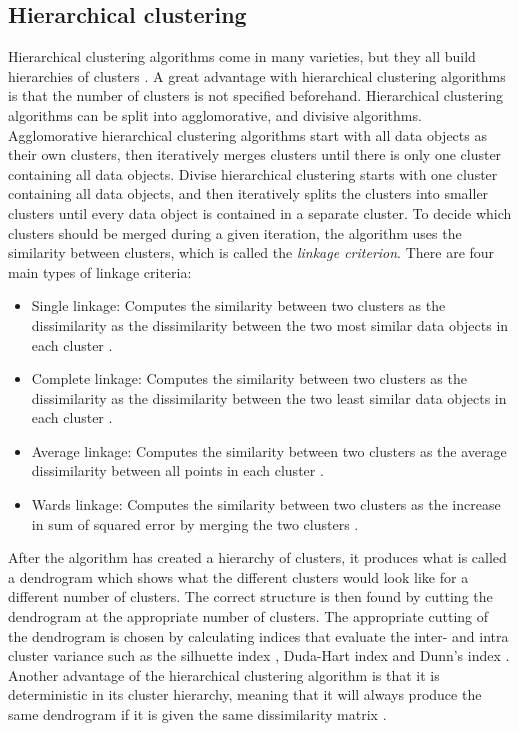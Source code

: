 \subsection{Hierarchical clustering}
Hierarchical clustering algorithms come in many varieties, but they all build hierarchies of clusters \cite{espen}.
A great advantage with hierarchical clustering algorithms is that the number of clusters is not specified beforehand. 
Hierarchical clustering algorithms can be split into agglomorative, and divisive algorithms.
Agglomorative hierarchical clustering algorithms start with all data objects as their own clusters, then iteratively merges clusters until there is only one cluster containing all data objects.
Divise hierarchical clustering starts with one cluster containing all data objects, and then iteratively splits the clusters into smaller clusters until every data object is contained in a separate cluster.
To decide which clusters should be merged during a given iteration, the algorithm uses the similarity between clusters, which is called the \textit{linkage criterion}.
There are four main types of linkage criteria: 
\begin{itemize}
    \item Single linkage:   Computes the similarity between two clusters as the dissimilarity as the dissimilarity between the two most similar data objects in each cluster \cite{dependency_tsc_energy_markets}.
    \item Complete linkage: Computes the similarity between two clusters as the dissimilarity as the dissimilarity between the two least similar data objects in each cluster \cite{financial_tsc_variance_ratio}.
    \item Average linkage:  Computes the similarity between two clusters as the average dissimilarity between all points in each cluster \cite{dependency_tsc_energy_markets}.
    \item Wards linkage:    Computes the similarity between two clusters as the increase in sum of squared error by merging the two clusters \cite{copula_ica_tsc}.
\end{itemize}

After the algorithm has created a hierarchy of clusters, it produces what is called a dendrogram which shows what the different clusters would look like for a different number of clusters. 
The correct structure is then found by cutting the dendrogram at the appropriate number of clusters. 
The appropriate cutting of the dendrogram is chosen by calculating indices that evaluate the inter- and intra cluster variance such as the silhuette index \cite{BSLEX_nonlin_nonstat_tsc, copula_ica_tsc}, Duda-Hart index \cite{financial_tsc_variance_ratio} and Dunn's index \cite{tsc_total_variation_distance}.
Another advantage of the hierarchical clustering algorithm is that it is deterministic in its cluster hierarchy, 
meaning that it will always produce the same dendrogram if it is given the same dissimilarity matrix \cite{espen}.

